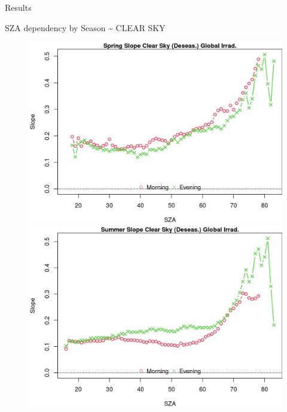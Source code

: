 \documentclass[
  ignorenonframetext,
]{beamer}
\begin{document}
\begin{frame}{Results}
\begin{block}{SZA dependency by Season \textasciitilde{} CLEAR SKY}
\begin{figure}
\begin{minipage}[t]{0.50\linewidth}
{}

\end{minipage}%
%
\begin{minipage}[t]{0.50\linewidth}

{\centering 

\includegraphics[width=4.48in,height=\textheight]{images/DHI_GHI_2_sza_trends_files/figure-html/szatrendsseas-51.png}

}

\end{minipage}%
\newline
\begin{minipage}[t]{0.50\linewidth}

{\centering 

\includegraphics[width=4.48in,height=\textheight]{images/DHI_GHI_2_sza_trends_files/figure-html/szatrendsseas-81.png}

}

\end{minipage}%
%
\begin{minipage}[t]{0.50\linewidth}


\end{minipage}
\end{figure}
\end{block}
\end{frame}
\end{document}
